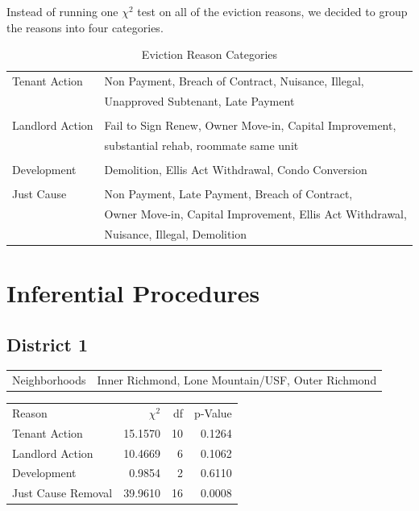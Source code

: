 \documentclass[]{article}
\begin{document}
Instead of running one $\chi ^{2}$ test on all of the eviction reasons, we decided to group the reasons into four categories.

\begin{table}[!h]
\begin{tabular}{l | l}

	Tenant Action    	& Non Payment, Breach of Contract, Nuisance, Illegal, 	  \\
						& Unapproved Subtenant, Late Payment			    	  \\\\
	Landlord Action     & Fail to Sign Renew, Owner Move-in, Capital Improvement, \\ 
						& substantial rehab, roommate same unit 				  \\\\
	Development    		& Demolition, Ellis Act Withdrawal, Condo Conversion      \\\\  
	Just Cause    		& Non Payment, Late Payment, Breach of Contract, 		  \\ 
						& Owner Move-in, Capital Improvement, Ellis Act Withdrawal, \\ 
						& Nuisance, Illegal, Demolition 						  \\	
	\end{tabular}
\caption{Eviction Reason Categories}
\end{table}

\section{Inferential Procedures}
\subsection{District 1}

\begin{table}[!h]
\centering
\begin{tabular}{l | l}
Neighborhoods & Inner Richmond, Lone Mountain/USF, Outer Richmond \\
\end{tabular}
\end{table}
\FloatBarrier

\begin {table}[!h]
\centering
\begin{tabular}{l | r | r | r}
	
	Reason	&  $\chi ^{2}$ & df & p-Value \\
	Tenant Action 		   &  15.1570  & 10  & 0.1264  \\
	Landlord Action	       &  10.4669  & 6   & 0.1062 \\
	Development			   &  0.9854   & 2   & 0.6110 \\
	Just Cause Removal	   &  39.9610  & 16  & 0.0008 \\
\end{tabular} \newline
\end{table}
\FloatBarrier
\end{document}
